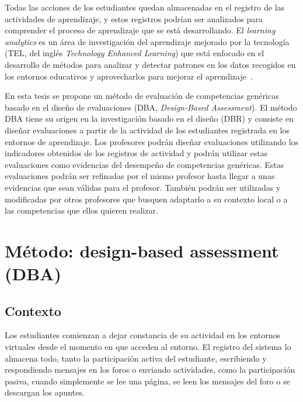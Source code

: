 Todas las acciones de los estudiantes quedan almacenadas en el registro de las actividades de aprendizaje, y estos registros podrían ser analizados para comprender el proceso de aprendizaje que se está desarrollando. El \emph{learning analytics} es un área de investigación del aprendizaje mejorado por la tecnología (TEL, del inglés \emph{Technology Enhanced Learning}) que está enfocado en el desarrollo de métodos para analizar y detectar patrones en los datos recogidos en los entornos educativos y aprovecharlos para mejorar el aprendizaje~\cite{chatti2014learning}.

En esta tesis se propone un método de evaluación de competencias genéricas basado en el diseño de evaluaciones (DBA, \emph{Design-Based Assessment}). El método DBA tiene su origen en la investigación basado en el diseño (DBR) y consiste en diseñar evaluaciones a partir de la actividad de los estudiantes registrada en los entornos de aprendizaje. Los profesores podrán diseñar evaluaciones utilizando los indicadores obtenidos de los registros de actividad y podrán utilizar estas evaluaciones como evidencias del desempeño de competencias genéricas. Estas evaluaciones podrán ser refinadas por el mismo profesor hasta llegar a unas evidencias que sean válidas para el profesor. También podrán ser utilizadas y modificadas por otros profesores que busquen adaptarlo a su contexto local o a las competencias que ellos quieren realizar. 



\section{Método: design-based assessment (DBA)}

\subsection{Contexto}

Los estudiantes comienzan a dejar constancia de su actividad en los entornos virtuales desde el momento en que acceden al entorno. El registro del sistema lo almacena todo, tanto la participación activa del estudiante, escribiendo y respondiendo mensajes en los foros o enviando actividades, como la participación pasiva, cuando simplemente se lee una página, se leen los mensajes del foro o se descargan los apuntes. 

